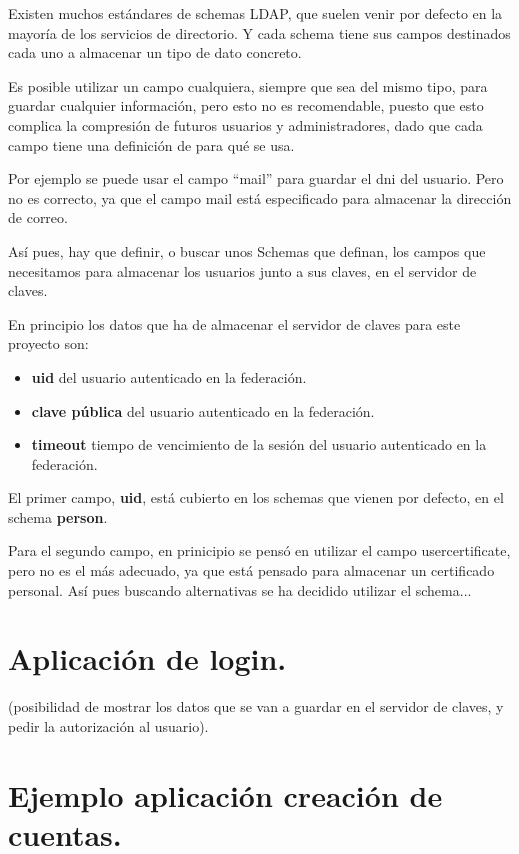     Existen muchos estándares de schemas LDAP, que suelen venir por defecto
    en la mayoría de los servicios de directorio. Y cada schema tiene sus
    campos destinados cada uno a almacenar un tipo de dato concreto.

    Es posible utilizar un campo cualquiera, siempre que sea del mismo
    tipo, para guardar cualquier información, pero esto no es recomendable,
    puesto que esto complica la compresión de futuros usuarios y
    administradores, dado que cada campo tiene una definición de para qué
    se usa.

    Por ejemplo se puede usar el campo ``mail'' para guardar el dni del
    usuario. Pero no es correcto, ya que el campo mail está especificado
    para almacenar la dirección de correo.

    Así pues, hay que definir, o buscar unos Schemas que definan, los
    campos que necesitamos para almacenar los usuarios junto a sus claves,
    en el servidor de claves.

    En principio los datos que ha de almacenar el servidor de claves para
    este proyecto son:

    \begin{itemize}

    \item \textbf{uid} del usuario autenticado en la federación.
    \item \textbf{clave pública} del usuario autenticado en la federación.
    \item \textbf{timeout} tiempo de vencimiento de la sesión del usuario autenticado en la federación.

    \end{itemize}

    El primer campo, \textbf{uid}, está cubierto en los schemas que vienen
    por defecto, en el schema \textbf{person}.

    Para el segundo campo, en prinicipio se pensó en utilizar el campo
    usercertificate, pero no es el más adecuado, ya que está pensado para
    almacenar un certificado personal. Así pues buscando alternativas se ha
    decidido utilizar el schema... %

    \section{Aplicación de login.}
     (posibilidad de mostrar los datos que se van a guardar en el servidor
     de claves, y pedir la autorización al usuario).

    \section{Ejemplo aplicación creación de cuentas.}
